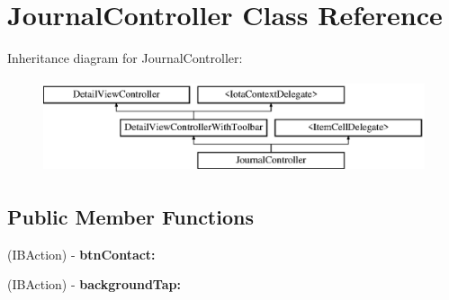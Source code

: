 \hypertarget{interface_journal_controller}{
\section{JournalController Class Reference}
\label{interface_journal_controller}
}
Inheritance diagram for JournalController:\begin{figure}[H]
\begin{center}
\leavevmode
\includegraphics[height=2.758621cm]{interface_journal_controller}
\end{center}
\end{figure}
\subsection*{Public Member Functions}
\begin{DoxyCompactItemize}
\item 
\hypertarget{interface_journal_controller_a0ccba21855d788874663bd2f0d364384}{
(IBAction) -\/ {\bfseries btnContact:}}
\label{interface_journal_controller_a0ccba21855d788874663bd2f0d364384}

\item 
\hypertarget{interface_journal_controller_a28ed20a6d9403c1164a7ac6038609696}{
(IBAction) -\/ {\bfseries backgroundTap:}}
\label{interface_journal_controller_a28ed20a6d9403c1164a7ac6038609696}

\end{DoxyCompactItemize}
